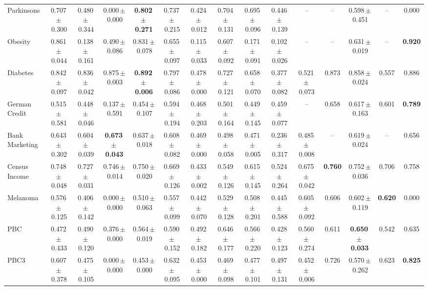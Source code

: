 \documentclass[8pt]{extarticle}
\begin{document}
\begin{longtable}{l*{14}{c}}
Parkinsons & 0.707\,$\pm$\,0.300 & 0.480\,$\pm$\,0.344 & 0.000\,$\pm$\,0.000 & \textbf{0.802\,$\pm$\,0.271} & 0.737\,$\pm$\,0.215 & 0.424\,$\pm$\,0.012 & 0.704\,$\pm$\,0.131 & 0.695\,$\pm$\,0.096 & 0.446\,$\pm$\,0.139 & -- & -- & 0.598\,$\pm$\,0.451 & -- & 0.000 \\
Obesity & 0.861\,$\pm$\,0.044 & 0.138\,$\pm$\,0.161 & 0.490\,$\pm$\,0.086 & 0.831\,$\pm$\,0.078 & 0.655\,$\pm$\,0.097 & 0.115\,$\pm$\,0.033 & 0.607\,$\pm$\,0.092 & 0.171\,$\pm$\,0.091 & 0.102\,$\pm$\,0.026 & -- & -- & 0.631\,$\pm$\,0.019 & -- & \textbf{0.920} \\
Diabetes & 0.842\,$\pm$\,0.097 & 0.836\,$\pm$\,0.042 & 0.875\,$\pm$\,0.003 & \textbf{0.892\,$\pm$\,0.006} & 0.797\,$\pm$\,0.086 & 0.478\,$\pm$\,0.000 & 0.727\,$\pm$\,0.121 & 0.658\,$\pm$\,0.070 & 0.377\,$\pm$\,0.082 & 0.521\,$\pm$\,0.073 & 0.873 & 0.858\,$\pm$\,0.024 & 0.557 & 0.886 \\
German Credit & 0.515\,$\pm$\,0.581 & 0.448\,$\pm$\,0.046 & 0.137\,$\pm$\,0.591 & 0.454\,$\pm$\,0.107 & 0.594\,$\pm$\,0.194 & 0.468\,$\pm$\,0.203 & 0.501\,$\pm$\,0.164 & 0.449\,$\pm$\,0.145 & 0.459\,$\pm$\,0.077 & -- & 0.658 & 0.617\,$\pm$\,0.163 & 0.601 & \textbf{0.789} \\
Bank Marketing & 0.643\,$\pm$\,0.302 & 0.604\,$\pm$\,0.039 & \textbf{0.673\,$\pm$\,0.043} & 0.637\,$\pm$\,0.018 & 0.608\,$\pm$\,0.082 & 0.469\,$\pm$\,0.000 & 0.498\,$\pm$\,0.058 & 0.471\,$\pm$\,0.005 & 0.236\,$\pm$\,0.317 & 0.485\,$\pm$\,0.008 & -- & 0.619\,$\pm$\,0.024 & -- & 0.656 \\
Census Income & 0.748\,$\pm$\,0.048 & 0.727\,$\pm$\,0.031 & 0.746\,$\pm$\,0.014 & 0.750\,$\pm$\,0.020 & 0.669\,$\pm$\,0.126 & 0.433\,$\pm$\,0.002 & 0.549\,$\pm$\,0.126 & 0.615\,$\pm$\,0.145 & 0.524\,$\pm$\,0.264 & 0.675\,$\pm$\,0.042 & \textbf{0.760} & 0.752\,$\pm$\,0.036 & 0.706 & 0.758 \\
Melanoma & 0.576\,$\pm$\,0.125 & 0.406\,$\pm$\,0.142 & 0.000\,$\pm$\,0.000 & 0.510\,$\pm$\,0.063 & 0.557\,$\pm$\,0.099 & 0.442\,$\pm$\,0.070 & 0.529\,$\pm$\,0.128 & 0.508\,$\pm$\,0.201 & 0.445\,$\pm$\,0.588 & 0.605\,$\pm$\,0.092 & 0.606 & 0.602\,$\pm$\,0.119 & \textbf{0.620} & 0.000 \\
PBC & 0.472\,$\pm$\,0.433 & 0.490\,$\pm$\,0.120 & 0.376\,$\pm$\,0.000 & 0.564\,$\pm$\,0.019 & 0.590\,$\pm$\,0.152 & 0.492\,$\pm$\,0.182 & 0.646\,$\pm$\,0.177 & 0.566\,$\pm$\,0.220 & 0.428\,$\pm$\,0.123 & 0.560\,$\pm$\,0.274 & 0.611 & \textbf{0.650\,$\pm$\,0.033} & 0.542 & 0.635 \\
PBC3 & 0.607\,$\pm$\,0.378 & 0.475\,$\pm$\,0.105 & 0.000\,$\pm$\,0.000 & 0.453\,$\pm$\,0.000 & 0.632\,$\pm$\,0.095 & 0.453\,$\pm$\,0.000 & 0.469\,$\pm$\,0.098 & 0.477\,$\pm$\,0.101 & 0.497\,$\pm$\,0.131 & 0.452\,$\pm$\,0.006 & 0.726 & 0.570\,$\pm$\,0.262 & 0.623 & \textbf{0.825} \\

\end{longtable}
\end{document}
